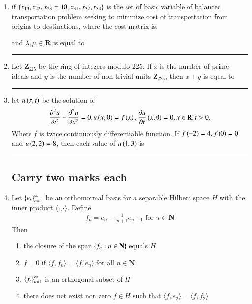 \documentclass[journal]{IEEEtran}
\numberwithin{equation}{enumi}
\numberwithin{figure}{enumi}
\begin{document}
\begin{enumerate}
		\hfill{}

		\item 
		if $\left\{x_{13}, x_{22}, x_{23} = 10, x_{31}, x_{32}, x_{34}\right\}$ is the set of basic variable of  balanced transportation problem seeking to minimize cost of transportation from origins to destinations, where the cost matrix is, 
		\begin{table}
			\centering
			
		\end{table}
		and $\lambda, \mu \in \mathbf{R}$ is equal to \rule{2cm}{1pt}
		
		\hfill{}

		\item 
		Let $\mathbf{Z}_{225}$ be the ring of integers modulo 225. If $x$ is the number of prime ideals and $y$ is the number of non trivial units $\mathbf{Z}_{225}$, then $x + y$ is equal to \rule{2cm}{0.1pt}
		
		\hfill{}

		\item 
		let $u\left(x,t\right)$ be the solution of
		\begin{align*}
		\frac{\partial^2 u}{\partial t^2} - \frac{\partial^2 u}{\partial x^2} = 0, u\left(x,0\right) = f\left(x\right), \frac{\partial u}{\partial t}\left(x,0\right) = 0, x\in \mathbf{R}, t > 0,
		\end{align*}
		Where $f$ is twice continuously differentiable function. If $f\left(-2\right) = 4, f\left(0\right) = 0$ and $u\left(2,2\right) = 8$, then each value of $u\left(1,3\right)$ is \rule{2cm}{0.1pt}
		
		\hfill{}

\subsection{Carry two marks each}
		\item 
		Let $\left\{e_n\right\}_{n = 1}^{\infty}$ be an orthomormal basis for a separable Hilbert space $H$ with the inner product $\langle \cdot, \cdot \rangle$. Define 
		\begin{align*}
			f_n = e_n - \frac{1}{n + 1}e_{n + 1} \text{ for } n \in \mathbf{N}
		\end{align*}
		Then 
		
		\hfill{}
		
		\begin{enumerate}
			\item the closure of the span $\left\{f_n : n \in \mathbf{N}\right\}$ equals $H$
			\item $f = 0$ if $\langle{f}, f_n \rangle = \langle f, e_n \rangle$ for all $ n \in \mathbf{N}$
			\item $\left\{f_n\right\}_{n = 1}^{\infty}$ is an orthogonal subset of $H$
			\item there does not exist non zero $f \in H$ such that $\langle f , e_2\rangle = \langle{f}, f_2\rangle$
		\end{enumerate}


\end{enumerate}
\end{document}
